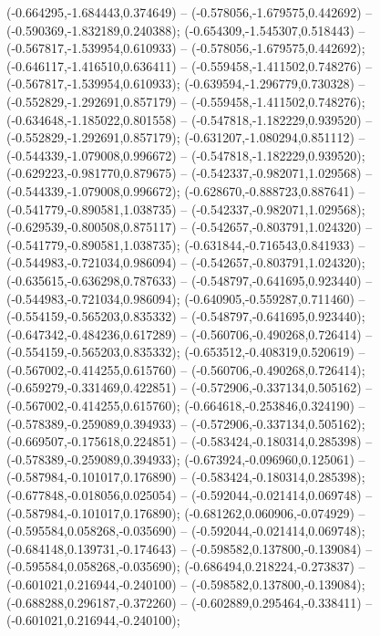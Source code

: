  (-0.664295,-1.684443,0.374649) -- (-0.578056,-1.679575,0.442692) -- (-0.590369,-1.832189,0.240388);
 (-0.654309,-1.545307,0.518443) -- (-0.567817,-1.539954,0.610933) -- (-0.578056,-1.679575,0.442692);
 (-0.646117,-1.416510,0.636411) -- (-0.559458,-1.411502,0.748276) -- (-0.567817,-1.539954,0.610933);
 (-0.639594,-1.296779,0.730328) -- (-0.552829,-1.292691,0.857179) -- (-0.559458,-1.411502,0.748276);
 (-0.634648,-1.185022,0.801558) -- (-0.547818,-1.182229,0.939520) -- (-0.552829,-1.292691,0.857179);
 (-0.631207,-1.080294,0.851112) -- (-0.544339,-1.079008,0.996672) -- (-0.547818,-1.182229,0.939520);
 (-0.629223,-0.981770,0.879675) -- (-0.542337,-0.982071,1.029568) -- (-0.544339,-1.079008,0.996672);
 (-0.628670,-0.888723,0.887641) -- (-0.541779,-0.890581,1.038735) -- (-0.542337,-0.982071,1.029568);
 (-0.629539,-0.800508,0.875117) -- (-0.542657,-0.803791,1.024320) -- (-0.541779,-0.890581,1.038735);
 (-0.631844,-0.716543,0.841933) -- (-0.544983,-0.721034,0.986094) -- (-0.542657,-0.803791,1.024320);
 (-0.635615,-0.636298,0.787633) -- (-0.548797,-0.641695,0.923440) -- (-0.544983,-0.721034,0.986094);
 (-0.640905,-0.559287,0.711460) -- (-0.554159,-0.565203,0.835332) -- (-0.548797,-0.641695,0.923440);
 (-0.647342,-0.484236,0.617289) -- (-0.560706,-0.490268,0.726414) -- (-0.554159,-0.565203,0.835332);
 (-0.653512,-0.408319,0.520619) -- (-0.567002,-0.414255,0.615760) -- (-0.560706,-0.490268,0.726414);
 (-0.659279,-0.331469,0.422851) -- (-0.572906,-0.337134,0.505162) -- (-0.567002,-0.414255,0.615760);
 (-0.664618,-0.253846,0.324190) -- (-0.578389,-0.259089,0.394933) -- (-0.572906,-0.337134,0.505162);
 (-0.669507,-0.175618,0.224851) -- (-0.583424,-0.180314,0.285398) -- (-0.578389,-0.259089,0.394933);
 (-0.673924,-0.096960,0.125061) -- (-0.587984,-0.101017,0.176890) -- (-0.583424,-0.180314,0.285398);
 (-0.677848,-0.018056,0.025054) -- (-0.592044,-0.021414,0.069748) -- (-0.587984,-0.101017,0.176890);
 (-0.681262,0.060906,-0.074929) -- (-0.595584,0.058268,-0.035690) -- (-0.592044,-0.021414,0.069748);
 (-0.684148,0.139731,-0.174643) -- (-0.598582,0.137800,-0.139084) -- (-0.595584,0.058268,-0.035690);
 (-0.686494,0.218224,-0.273837) -- (-0.601021,0.216944,-0.240100) -- (-0.598582,0.137800,-0.139084);
 (-0.688288,0.296187,-0.372260) -- (-0.602889,0.295464,-0.338411) -- (-0.601021,0.216944,-0.240100);
